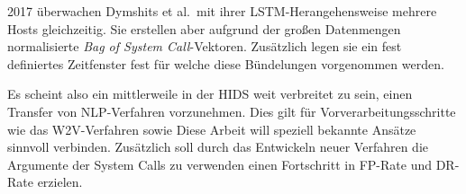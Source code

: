         2017 überwachen Dymshits et al.\ mit ihrer LSTM-Herangehensweise mehrere Hosts gleichzeitig.
        Sie erstellen aber aufgrund der großen Datenmengen normalisierte \textit{Bag of System Call}-Vektoren.
        Zusätzlich legen sie ein fest definiertes Zeitfenster fest für welche diese Bündelungen vorgenommen werden.~\cite{LSTMDYMSHITS2017}

        Es scheint also ein mittlerweile in der \ac{HIDS} weit verbreitet zu sein, einen Transfer von \ac{NLP}-Verfahren vorzunehmen.
        Dies gilt für Vorverarbeitungsschritte wie das \ac{W2V}-Verfahren sowie 
        Diese Arbeit will speziell bekannte Ansätze sinnvoll verbinden.
        Zusätzlich soll durch das Entwickeln neuer Verfahren die Argumente der System Calls zu verwenden einen Fortschritt in \ac{FP}-Rate und \ac{DR}-Rate erzielen.





